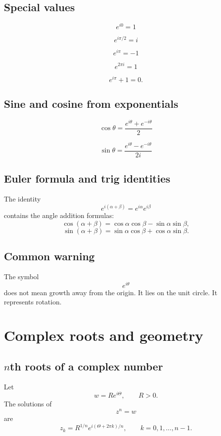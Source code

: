 \subsection*{Special values}

\[
\boxed{
    e^{i0}=1
}
\]

\[
\boxed{
    e^{i\pi/2}=i
}
\]

\[
\boxed{
    e^{i\pi}=-1
}
\]

\[
\boxed{
    e^{2\pi i}=1
}
\]

\[
\boxed{
    e^{i\pi}+1=0.
}
\]

\subsection*{Sine and cosine from exponentials}

\[
\boxed{
    \cos\theta=\frac{e^{i\theta}+e^{-i\theta}}{2}
}
\]

\[
\boxed{
    \sin\theta=\frac{e^{i\theta}-e^{-i\theta}}{2i}
}
\]

\subsection*{Euler formula and trig identities}

The identity
\[
    e^{i(\alpha+\beta)}=e^{i\alpha}e^{i\beta}
\]
contains the angle addition formulas:
\[
    \cos(\alpha+\beta)
    =
    \cos\alpha\cos\beta-\sin\alpha\sin\beta,
\]
\[
    \sin(\alpha+\beta)
    =
    \sin\alpha\cos\beta+\cos\alpha\sin\beta.
\]

\subsection*{Common warning}

The symbol
\[
    e^{i\theta}
\]
does not mean growth away from the origin.  It lies on the unit circle.  It represents
rotation.

\section{Complex roots and geometry}
\label{app:B.5}

\subsection*{\(n\)th roots of a complex number}

Let
\[
    w=Re^{i\Theta},
    \qquad
    R>0.
\]
The solutions of
\[
    z^n=w
\]
are
\[
\boxed{
    z_k
    =
    R^{1/n}e^{i(\Theta+2\pi k)/n},
    \qquad
    k=0,1,\ldots,n-1.
}
\]

